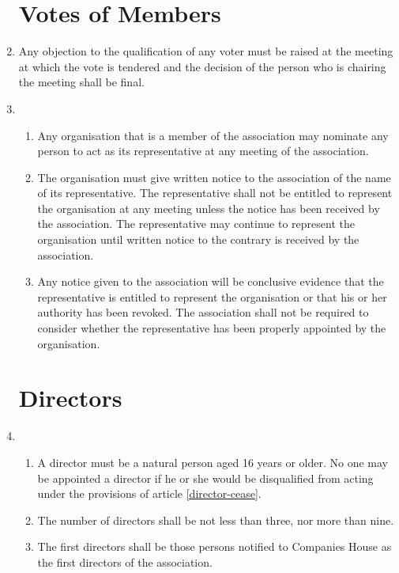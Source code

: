 \begin{enumerate}
\section{Votes of Members}

\item
  Any objection to the qualification of any voter must be raised at
  the meeting at which the vote is tendered and the decision of the
  person who is chairing the meeting shall be final.
\item
  \begin{enumerate}
  \item
    Any organisation that is a member of the association may nominate any
    person to act as its representative at any meeting of the association.
  \item
    The organisation must give written notice to the association of the
    name of its representative. The representative shall not be
    entitled to represent the organisation at any meeting unless the
    notice has been received by the association. The representative may
    continue to represent the organisation until written notice to the
    contrary is received by the association.
  \item
    Any notice given to the association will be conclusive evidence that
    the representative is entitled to represent the organisation or
    that his or her authority has been revoked. The association shall not
    be required to consider whether the representative has been
    properly appointed by the organisation.
  \end{enumerate}

\section{Directors}

\item
  \begin{enumerate}
  \item
    A director must be a natural person aged 16 years or older.
    No one may be appointed a director if he or she would be
    disqualified from acting under the provisions of article
    \ref{director-cease}.
  \item
    The number of directors shall be not less than three, nor more than nine.

  \item
    The first directors shall be those persons notified to Companies
    House as the first directors of the association.


\end{enumerate}
\end{enumerate}
